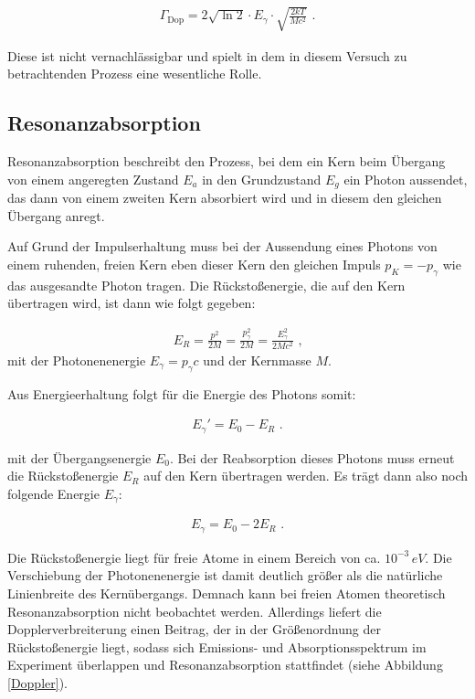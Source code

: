 \begin{align}
\Gamma_\text{Dop} = 2\sqrt{\ln2}\cdot E_{\gamma}\cdot\sqrt{\frac{2kT}{Mc^2}}\text{ .}
\end{align}

Diese ist nicht vernachlässigbar und spielt in dem in diesem Versuch zu betrachtenden Prozess eine wesentliche Rolle. \cite{jakobs}

\subsection{Resonanzabsorption}

Resonanzabsorption beschreibt den Prozess, bei dem ein Kern beim Übergang von einem angeregten Zustand $E_a$ in den Grundzustand $E_g$ ein Photon aussendet, das dann von einem zweiten Kern absorbiert wird und in diesem den gleichen Übergang anregt. 

Auf Grund der Impulserhaltung muss bei der Aussendung eines Photons von einem ruhenden, freien Kern eben dieser Kern den gleichen Impuls  $p_K = -p_{\gamma}$ wie das ausgesandte Photon tragen. Die Rückstoßenergie, die auf den Kern übertragen wird, ist dann wie folgt gegeben:

\begin{align}
E_R = \frac{p^2}{2M} = \frac{p_{\gamma}^2}{2M} = \frac{E_{\gamma}^2}{2Mc^2} \text{ ,}\label{5}
\end{align}
mit der Photonenenergie $E_{\gamma}=p_{\gamma}c$ und der Kernmasse $M$.

Aus Energieerhaltung folgt für die Energie des Photons somit:

\begin{align}
E_{\gamma}' = E_0 - E_R\text{ .}
\end{align}

mit der Übergangsenergie $E_0$. Bei der Reabsorption dieses Photons muss erneut die Rückstoßenergie $E_R$  auf den Kern übertragen werden. Es trägt dann also noch folgende Energie $E_{\gamma}$:

\begin{align}
E_{\gamma} = E_0-2E_R\text{ .}
\end{align}

Die Rückstoßenergie liegt für freie Atome in einem Bereich von ca.  $10^{-3}\,\si{eV}$. Die Verschiebung der Photonenenergie ist damit deutlich größer als die natürliche Linienbreite des Kernübergangs. Demnach kann bei freien Atomen theoretisch Resonanzabsorption nicht beobachtet werden. Allerdings liefert die Dopplerverbreiterung einen Beitrag, der in der Größenordnung der Rückstoßenergie liegt, sodass sich Emissions- und Absorptionsspektrum im Experiment überlappen und Resonanzabsorption stattfindet (siehe Abbildung \ref{Doppler}).

